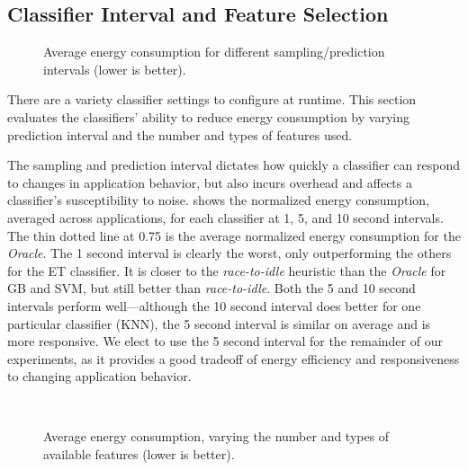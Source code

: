 \subsection{Classifier Interval and Feature Selection}
\label{sec:eval-clf-settings}

\begin{figure}[t]
  \centering
  
  \caption{Average energy consumption for different sampling/prediction intervals (lower is better).}
  \label{fig:interval}
\end{figure}

There are a variety classifier settings to configure at runtime.
This section evaluates the classifiers' ability to reduce energy consumption by varying prediction interval and the number and types of features used.

The sampling and prediction interval dictates how quickly a classifier can respond to changes in application behavior, but also incurs overhead and affects a classifier's susceptibility to noise.
 shows the normalized energy consumption, averaged across applications, for each classifier at 1, 5, and 10 second intervals.
The thin dotted line at 0.75 is the average normalized energy consumption for the \emph{Oracle}.
The 1 second interval is clearly the worst, only outperforming the others for the ET classifier.
It is closer to the \emph{race-to-idle} heuristic than the \emph{Oracle} for GB and SVM, but still better than \emph{race-to-idle}.
Both the 5 and 10 second intervals perform well---although the 10 second interval does better for one particular classifier (KNN), the 5 second interval is similar on average and is more responsive.
We elect to use the 5 second interval for the remainder of our experiments, as it provides a good tradeoff of energy efficiency and responsiveness to changing application behavior.

\begin{figure}[t]
  \centering
  \\
  \caption{Average energy consumption, varying the number and types of available features (lower is better).}
  \label{fig:pca}
\end{figure}

